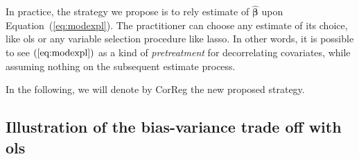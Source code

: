 \documentclass[11pt,a4paper]{article}
\begin{document}
In practice, the strategy we propose is to rely estimate of  $\hat{\boldsymbol{\beta}}$ upon Equation~(\ref{eq:modexpl}). The practitioner can choose any estimate of its choice, like {\sc ols} or any variable selection procedure like {\sc lasso}. In other words, it is possible to see $(\ref{eq:modexpl})$ as a kind of {\it pretreatment} for decorrelating covariates, while assuming nothing on the subsequent estimate process.

In the following, we will denote by {\sc CorReg} the new proposed strategy.

	\subsection{Illustration of the bias-variance trade off with {\sc ols}}	\label{sec:tradeoff}
	
\end{document}
